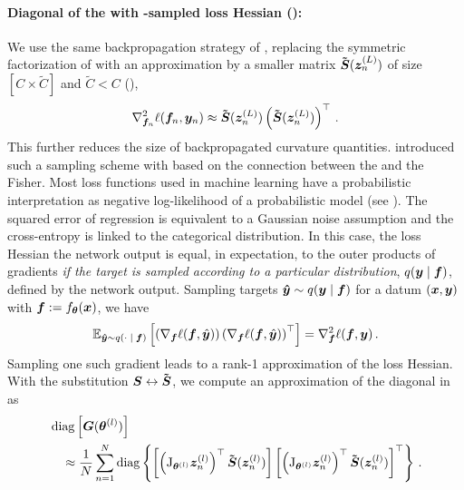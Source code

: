 \paragraph{Diagonal of the \GGN with \MC-sampled loss Hessian (\DiagGGNMC):}
We use the same backpropagation strategy of
, replacing the symmetric factorization
of  with an approximation by a smaller
matrix $\bm{\tilde{{\bm{S}}}}({\bm{z}}^{(L)}_n)$ of size $[C \times \tilde{C}]$ and $\tilde{C}<C$
(\eg {}),
\begin{align}
  \nabla_{{\bm{f}}_n}^2 \ell({\bm{f}}_n, {\bm{y}}_n)
  \approx
  \bm{\tilde{{\bm{S}}}}({\bm{z}}^{(L)}_n)
  \left(\bm{\tilde{{\bm{S}}}}({\bm{z}}^{(L)}_n)\right)^\top\,{.}
  \label{backpack::equ:loss_hessian_mc_sqrt}
\end{align}
This further reduces the size of backpropagated curvature quantities.
\citet{martens2015optimizing} introduced such a sampling scheme with \KFAC based
on the connection between the \GGN and the Fisher. Most loss functions used in
machine learning have a probabilistic interpretation as negative log-likelihood
of a probabilistic model (see
). The squared error of
regression is equivalent to a Gaussian noise assumption and the cross-entropy is
linked to the categorical distribution. In this case, the loss Hessian \wrt the
network output is equal, in expectation, to the outer products of gradients
\emph{if the target is sampled according to a particular distribution},
$q({\bm{y}}\;|\;{\bm{f}})$, defined by the network output. Sampling targets
${\bm{\hat{y}}} \sim q({\bm{y}}\;|\;{\bm{f}})$ for a datum $({\bm{x}}, {\bm{y}})$ with ${\bm{f}} :=
f_{{\bm{\theta}}}({\bm{x}})$, we have
\begin{equation}
  \mathbb{E}_{{\bm{\hat{y}}} \sim q(\cdot\;|\;{\bm{f}})}
  \left[
    \left(
      \nabla_{\bm{f}} \ell({\bm{f}}, \hat{{\bm{y}}})
    \right)
    \left(
      \nabla_{\bm{f}} \ell({\bm{f}}, \hat{{\bm{y}}})
    \right)^\top
  \right]
  = \nabla^2_{\bm{f}} \ell({\bm{f}}, {\bm{y}})\,{.}
\end{equation}
Sampling one such gradient leads to a rank-1 \MC approximation of the loss
Hessian. With the substitution ${\bm{S}} \leftrightarrow \bm{\tilde{{\bm{S}}}}$, we compute an \MC
approximation of the \GGN diagonal in \BackPACK as
\begin{align}
  \begin{split}
    &\operatorname{diag}\left[{\bm{G}}({\bm{\theta}}^{(l)})\right]
    \\
    &\quad\approx
      \dfrac{1}{N}
      \sum_{n=1}^N
      \operatorname{diag} \left\{
      \left[
      \left(\mathrm{J}_{{\bm{\theta}}^{(l)}} {\bm{z}}^{(l)}_n\right)^\top \bm{\tilde{{\bm{S}}}}({\bm{z}}^{(l)}_n)
      \right]
      \left[\left(\mathrm{J}_{{\bm{\theta}}^{(l)}} {\bm{z}}^{(l)}_n\right)^\top \bm{\tilde{{\bm{S}}}}({\bm{z}}^{(l)}_n)
      \right]^\top
      \right\}\,{.}
  \end{split}\label{backpack::equ:block_diag_ggn_mc}
\end{align}


